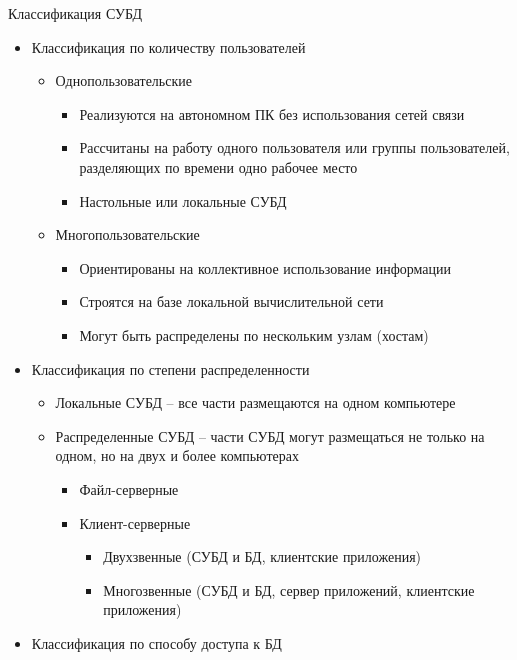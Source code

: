 \documentclass[12pt]{article}
\begin{document}
\begin{nota}{Классификация СУБД}
    \begin{itemize}
        \item Классификация по количеству пользователей 
        
        \begin{itemize}
            \item Однопользовательские 
            
            \begin{itemize}
                \item Реализуются на автономном ПК без использования сетей связи 
                \item Рассчитаны на работу одного пользователя или группы пользователей, разделяющих по времени одно рабочее место 
                \item Настольные или локальные СУБД 
            \end{itemize}

            \item Многопользовательские 
            
            \begin{itemize}
                \item Ориентированы на коллективное использование информации 
                \item Строятся на базе локальной вычислительной сети 
                \item Могут быть распределены по нескольким узлам (хостам)
            \end{itemize}
        \end{itemize}

        \item Классификация по степени распределенности
        
        \begin{itemize}
            \item Локальные СУБД -- все части размещаются на одном компьютере 
            \item Распределенные СУБД -- части СУБД могут размещаться не только на одном, но на двух и более компьютерах 
            
            \begin{itemize}
                \item Файл-серверные
                \item Клиент-серверные 
                
                \begin{itemize}
                    \item Двухзвенные (СУБД и БД, клиентские приложения)
                    \item Многозвенные (СУБД и БД, сервер приложений, клиентские приложения)
                \end{itemize}
            \end{itemize}
        \end{itemize}
        \item Классификация по способу доступа к БД 
    \end{itemize}
\end{nota}
\end{document}
